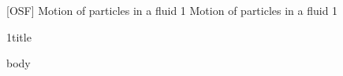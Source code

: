 \documentclass[\mainfilename]{subfiles}
\begin{document}

[OSF]
{Motion of particles in a fluid 1} %
{Motion of particles in a fluid 1} %

\begin{sectionBox}1{title} %
    
    body
    
\end{sectionBox}
\end{document}
